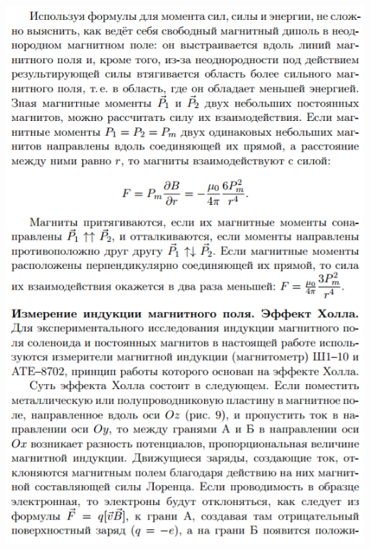 \documentclass[12pt]{article}
\begin{document}
\begin{center}
	    \includegraphics[width=15cm]{theory12.png}

\end{center}
\end{document}
